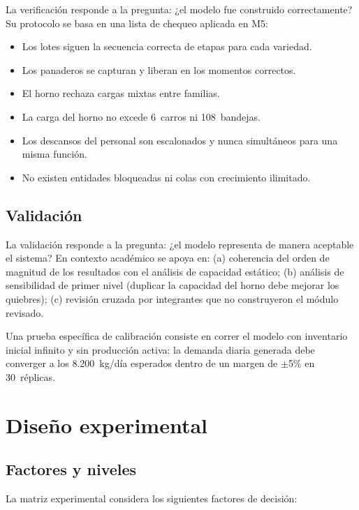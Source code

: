 \documentclass[12pt]{article}
\begin{document}
La verificación responde a la pregunta: ¿el modelo fue construido correctamente? Su protocolo se basa en una lista de chequeo aplicada en M5:
\begin{itemize}
  \item Los lotes siguen la secuencia correcta de etapas para cada variedad.
  \item Los panaderos se capturan y liberan en los momentos correctos.
  \item El horno rechaza cargas mixtas entre familias.
  \item La carga del horno no excede 6~carros ni 108~bandejas.
  \item Los descansos del personal son escalonados y nunca simultáneos para una misma función.
  \item No existen entidades bloqueadas ni colas con crecimiento ilimitado.
\end{itemize}

\subsection{Validación}

La validación responde a la pregunta: ¿el modelo representa de manera aceptable el sistema? En contexto académico se apoya en: (a) coherencia del orden de magnitud de los resultados con el análisis de capacidad estático; (b) análisis de sensibilidad de primer nivel (duplicar la capacidad del horno debe mejorar los quiebres); (c) revisión cruzada por integrantes que no construyeron el módulo revisado.

Una prueba específica de calibración consiste en correr el modelo con inventario inicial infinito y sin producción activa: la demanda diaria generada debe converger a los 8.200~kg/día esperados dentro de un margen de $\pm$5\% en 30~réplicas.

\newpage
\section{Diseño experimental}

\subsection{Factores y niveles}

La matriz experimental considera los siguientes factores de decisión:
\end{document}

